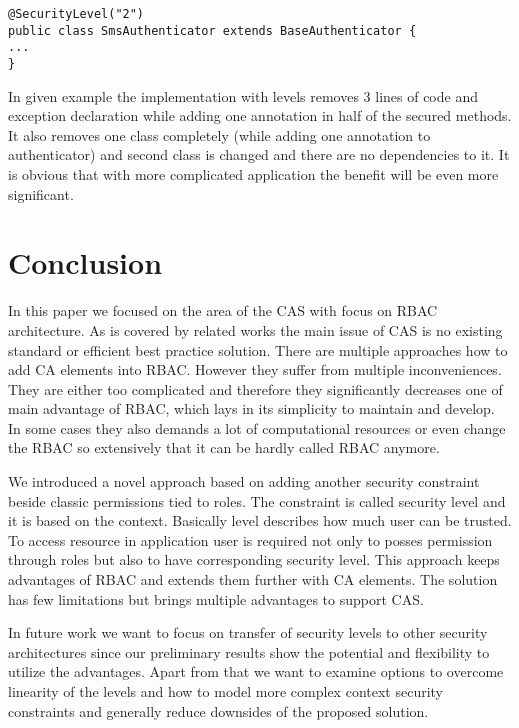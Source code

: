 \documentclass{sig-alternate}
\begin{document}
\begin{lstlisting}[]
@SecurityLevel("2")
public class SmsAuthenticator extends BaseAuthenticator {
...
}
\end{lstlisting}

In given example the implementation with levels removes 3 lines of code and exception declaration while adding one annotation in half of the secured methods. It also removes one class completely (while adding one annotation to authenticator) and second class is changed and there are no dependencies to it. It is obvious that with more complicated application the benefit will be even more significant.

\section{Conclusion}
In this paper we focused on the area of the CAS with focus on RBAC architecture. As is covered by related works the main issue of CAS is no existing standard or efficient best practice solution. There are multiple approaches how to add CA elements into RBAC. However they suffer from multiple inconveniences. They are either too complicated and therefore they significantly decreases one of main advantage of RBAC, which lays in its simplicity to maintain and develop. In some cases they also demands a lot of computational resources or even change the RBAC so extensively that it can be hardly called RBAC anymore.

We introduced a novel approach based on adding another security constraint beside classic permissions tied to roles. The constraint is called security level and it is based on the context. Basically level describes how much user can be trusted. To access resource in application user is required not only to posses permission through roles but also to have corresponding security level. This approach keeps advantages of RBAC and extends them further with CA elements. The solution has few limitations but brings multiple advantages to support CAS. 

In future work we want to focus on transfer of security levels to other security architectures since our preliminary results show the potential and flexibility to utilize the advantages. Apart from that we want to examine options to overcome linearity of the levels and how to model more complex context security constraints and generally reduce downsides of the proposed solution.
\end{document}
